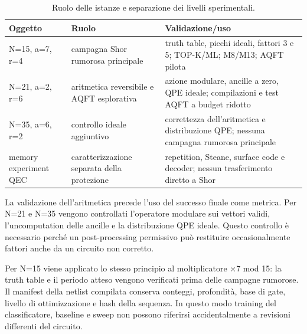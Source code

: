 \begingroup
\small
\begin{table}[!htbp]
\centering
\small

\begin{tabular}{@{}
  >{\raggedright\arraybackslash}p{}
  >{\raggedright\arraybackslash}p{}
  >{\raggedright\arraybackslash}p{}@{}}
\toprule
\textbf{Oggetto} & \textbf{Ruolo} & \textbf{Validazione/\allowbreak{}uso} \\
\midrule
N=15, a=7, r=4 & campagna Shor rumorosa principale & truth table, picchi ideali, fattori 3 e 5; TOP-K/\allowbreak{}ML; M8/M13; AQFT pilota \\
\addlinespace[0.3em]
N=21, a=2, r=6 & aritmetica reversibile e AQFT esplorativa & azione modulare, ancille a zero, QPE ideale; compilazioni e test AQFT a budget ridotto \\
\addlinespace[0.3em]
N=35, a=6, r=2 & controllo ideale aggiuntivo & correttezza dell'aritmetica e distribuzione QPE; nessuna campagna rumorosa principale \\
\addlinespace[0.3em]
memory experiment QEC & caratterizzazione separata della protezione & repetition, Steane, surface code e decoder; nessun trasferimento diretto a Shor \\
\bottomrule
\end{tabular}
\caption{Ruolo delle istanze e separazione dei livelli sperimentali.}\label{tab:finale_3_5}

\end{table}
\endgroup

La validazione dell'aritmetica precede l'uso del successo finale come metrica. Per N=21 e N=35 vengono controllati l'operatore modulare sui vettori validi, l'uncomputation delle ancille e la distribuzione QPE ideale. Questo controllo è necessario perché un post-processing permissivo può restituire occasionalmente fattori anche da un circuito non corretto.

Per N=15 viene applicato lo stesso principio al moltiplicatore ×7 mod 15: la truth table e il periodo atteso vengono verificati prima delle campagne rumorose. Il manifest della netlist compilata conserva conteggi, profondità, base di gate, livello di ottimizzazione e hash della sequenza. In questo modo training del classificatore, baseline e sweep non possono riferirsi accidentalmente a revisioni differenti del circuito.

